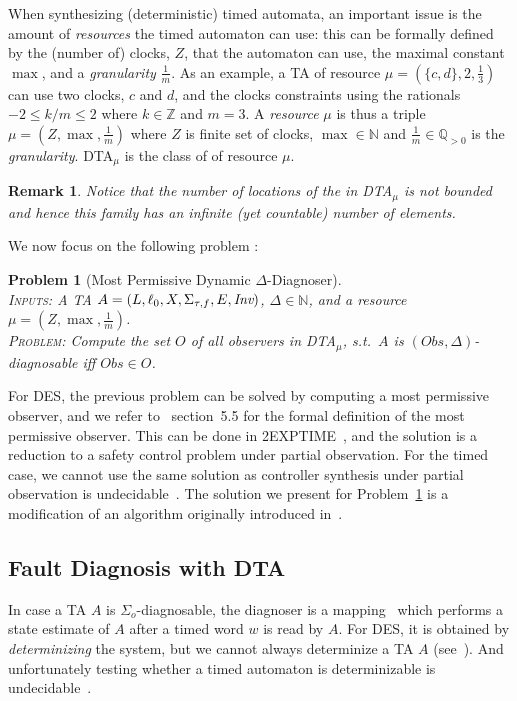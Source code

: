 \documentclass[letterpaper,10pt,conference]{ieeeconf}  \IEEEoverridecommandlockouts                              \overrideIEEEmargins
\def\st{{s.t.}~}
\newtheorem{prob}{Problem}  \newtheorem{definition}{Definition}
\newtheorem{remark}{Remark}
\newcommand{\setN}{\mathbb N}
\newcommand{\setZ}{\mathbb Z}
\newcommand{\setQ}{\mathbb Q}
\def\tauac{\tau}
\def\dtamu{DTA$_\mu$\xspace}
\def\obs{\textit{Obs}\xspace}
\begin{document}
When synthesizing (deterministic) timed automata, an important issue
is the amount of \emph{resources} the timed automaton can use: this
can be formally defined~\cite{BDMP-cav-2003} by the (number of) clocks, $Z$,
that the automaton can use, the maximal constant $\max$, and a
\emph{granularity} $\frac{1}{m}$. As an example, a TA of resource
$\mu=(\{c,d\},2,\frac{1}{3})$ can use two clocks, $c$ and $d$, and the
clocks constraints using the rationals $-2 \leq k/m \leq 2$ where $k
\in \setZ$ and $m=3$.  A \emph{resource} $\mu$ is thus a triple
$\mu=(Z,\max,\frac{1}{m})$ where $Z$ is finite set of clocks, $\max
\in \setN$ and $\frac{1}{m} \in \setQ_{>0}$ is the \emph{granularity}.
\dtamu is the class of \dta of resource $\mu$.
\begin{remark}
  Notice that the number of locations of the \dta in \dtamu is not
  bounded and hence this family has an infinite (yet countable) number
  of elements.
\end{remark}

We now focus on the following problem :
\begin{prob}[Most Permissive Dynamic $\Delta$-Diagnoser] \label{prob-dynamic-synth} \mbox{} \\
  \textsc{Inputs:} A TA $A=(L,\ell_0,X,\Sigma_{\tauac,f},E,\inv)$,
  $\Delta \in \setN$,
  and a resource $\mu=(Z,\max,\frac{1}{m})$.\\
  \textsc{Problem:} Compute the set $O$ of all observers in \dtamu,
  \st $A$ is $(\obs,\Delta)$-diagnosable iff $\obs \in O$.
\end{prob}
For DES, the previous problem can be solved by computing a most
permissive observer, and we refer to~\cite{cassez-fi-08} section~5.5
for the formal definition of the most permissive observer. This can be
done in 2EXPTIME~\cite{cassez-fi-08}, and the solution is a reduction
to a safety control problem under partial observation.  For the timed
case, we cannot use the same solution as controller synthesis under
partial observation is undecidable~\cite{BDMP-cav-2003}.  The solution
we present for Problem~\ref{prob-dynamic-synth} is a modification of
an algorithm originally introduced in~\cite{Bouyerfossacs05}. 


\subsection{Fault Diagnosis with DTA~\cite{Bouyerfossacs05}}\label{sec-algo}
In case a TA $A$ is $\Sigma_o$-diagnosable, the diagnoser is a
mapping~\cite{tripakis-02} which performs a state estimate of $A$
after a timed word $w$ is read by $A$.  For DES, it is obtained by
\emph{determinizing} the system, but we cannot always determinize a TA
$A$ (see~\cite{AlurDill94}).  And unfortunately testing whether a
timed automaton is determinizable is
undecidable~\cite{Finkel05,TripakisFolk}.
\end{document}
